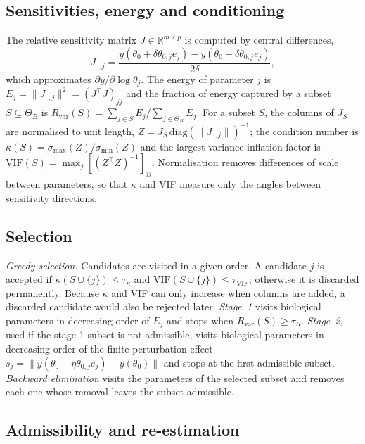 \documentclass[pdflatex,sn-nature]{sn-jnl}
\theoremstyle{plain}
\begin{document}
\subsection*{Sensitivities, energy and conditioning}

The relative sensitivity matrix $J\in\mathbb{R}^{m\times p}$ is computed by central differences,
\begin{equation}
J_{:,j}=\frac{y(\theta_0+\delta\theta_{0,j}e_j)-y(\theta_0-\delta\theta_{0,j}e_j)}{2\delta},
\label{eq:jac}
\end{equation}
which approximates $\partial y/\partial\log\theta_j$. The energy of parameter $j$ is $E_j=\|J_{:,j}\|^2=(J^\top J)_{jj}$ and the fraction of energy captured by a subset $S\subseteq\Theta_B$ is $R_{\mathrm{var}}(S)=\sum_{j\in S}E_j/\sum_{j\in\Theta_B}E_j$. For a subset $S$, the columns of $J_S$ are normalised to unit length, $Z=J_S\,\mathrm{diag}(\|J_{:,j}\|)^{-1}$; the condition number is $\kappa(S)=\sigma_{\max}(Z)/\sigma_{\min}(Z)$ and the largest variance inflation factor is $\mathrm{VIF}(S)=\max_j[(Z^\top Z)^{-1}]_{jj}$\cite{bib5,bib9}. Normalisation removes differences of scale between parameters, so that $\kappa$ and VIF measure only the angles between sensitivity directions.

\subsection*{Selection}

\emph{Greedy selection.} Candidates are visited in a given order. A candidate $j$ is accepted if $\kappa(S\cup\{j\})\le\tau_\kappa$ and $\mathrm{VIF}(S\cup\{j\})\le\tau_{\mathrm{VIF}}$; otherwise it is discarded permanently. Because $\kappa$ and VIF can only increase when columns are added, a discarded candidate would also be rejected later. \emph{Stage~1} visits biological parameters in decreasing order of $E_j$ and stops when $R_{\mathrm{var}}(S)\ge\tau_R$. \emph{Stage~2}, used if the stage-1 subset is not admissible, visits biological parameters in decreasing order of the finite-perturbation effect $s_j=\|y(\theta_0+\eta\theta_{0,j}e_j)-y(\theta_0)\|$ and stops at the first admissible subset. \emph{Backward elimination} visits the parameters of the selected subset and removes each one whose removal leaves the subset admissible.

\subsection*{Admissibility and re-estimation}
\end{document}

